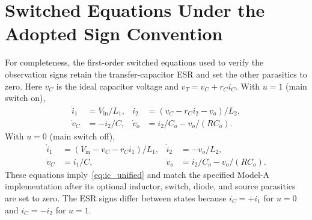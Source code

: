 \section{Switched Equations Under the Adopted Sign Convention}
\label{app:equations}

For completeness, the first-order switched equations used to verify the observation signs retain the transfer-capacitor ESR and set the other parasitics to zero. Here $v_C$ is the ideal capacitor voltage and $v_T=v_C+r_Ci_C$. With $u=1$ (main switch on),
\begin{align}
\dot i_1&=V_{\mathrm{in}}/L_1, &
\dot i_2&=(v_C-r_Ci_2-v_o)/L_2,\\
\dot v_C&=-i_2/C, &
\dot v_o&=i_2/C_o-v_o/(RC_o).
\end{align}
With $u=0$ (main switch off),
\begin{align}
\dot i_1&=(V_{\mathrm{in}}-v_C-r_Ci_1)/L_1, &
\dot i_2&=-v_o/L_2,\\
\dot v_C&=i_1/C, &
\dot v_o&=i_2/C_o-v_o/(RC_o).
\end{align}
These equations imply~\eqref{eq:ic_unified} and match the specified Model-A implementation after its optional inductor, switch, diode, and source parasitics are set to zero. The ESR signs differ between states because $i_C=+i_1$ for $u=0$ and $i_C=-i_2$ for $u=1$.
